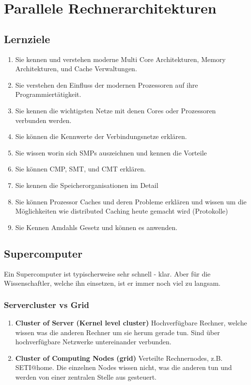 \chapter{Parallele Rechnerarchitekturen}

\section{Lernziele}
\begin{enumerate}
	\item Sie kennen und verstehen moderne Multi Core Architekturen, Memory Architekturen, und Cache Verwaltungen.
	\item Sie verstehen den Einfluss der modernen Prozessoren auf ihre Programmiertätigkeit.
	\item Sie kennen die wichtigsten Netze mit denen Cores oder Prozessoren verbunden werden.
	\item Sie können die Kennwerte der Verbindungsnetze erklären.
	\item Sie wissen worin sich SMPs auszeichnen und kennen die Vorteile
	\item Sie können CMP, SMT, und CMT erklären.
	\item Sie kennen die Speicherorganisationen im Detail
	\item Sie können Prozessor Caches und deren Probleme erklären und wissen um die Möglichkeiten wie distributed Caching heute gemacht wird (Protokolle)
	\item Sie Kennen Amdahls Gesetz und können es anwenden.
\end{enumerate}

\section{Supercomputer}
Ein Supercomputer ist typischerweise sehr schnell - klar. Aber für die Wissenschaftler, welche ihn einsetzen, ist er immer noch viel zu langsam.

\subsection{Servercluster vs Grid}
\begin{enumerate}
	\item \textbf{Cluster of Server (Kernel level cluster)}
		\subitem Hochverfügbare Rechner, welche wissen was die anderen Rechner um sie herum gerade tun. Sind über hochverfügbare Netzwerke untereinander verbunden.
	\item \textbf{Cluster of Computing Nodes (grid)}
		\subitem Verteilte Rechnernodes, z.B. SETI@home. Die einzelnen Nodes wissen nicht, was die anderen tun und werden von einer zentralen Stelle aus gesteuert.
\end{enumerate}

